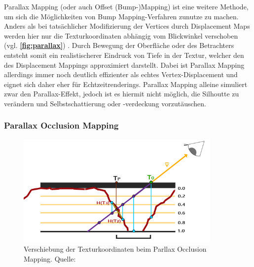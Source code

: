 Parallax Mapping (oder auch Offset (Bump-)Mapping) ist eine weitere Methode, um sich die Möglichkeiten von
Bump Mapping-Verfahren zunutze zu machen. Anders als bei tatsächlicher Modifizierung der Vertices
durch Displacement Maps werden hier nur die Texturkoordinaten abhängig vom Blickwinkel verschoben (vgl. \textbf{\autoref{fig:parallax}}) \parencite{Kaneko2001, Welsh2004}.
Durch Bewegung der Oberfläche oder des Betrachters entsteht somit ein realistischerer Eindruck
von Tiefe in der Textur, welcher den des Displacement Mappings approximiert darstellt.
Dabei ist Parallax Mapping allerdings immer noch deutlich effizienter als echtes Vertex-Displacement
und eignet sich daher eher für Echtzeitrenderings.
Parallax Mapping alleine simuliert zwar den Parallax-Effekt, jedoch ist es hiermit nicht möglich, die Silhoutte zu verändern und
Selbstschattierung oder -verdeckung vorzutäuschen.


\subsubsection{Parallax Occlusion Mapping}
\label{sec:3.3.4}

\begin{figure}
	\centering
	\includegraphics[width=0.89\textwidth]{Grafiken/Basics/Mapping/Infografik_POM.png}
	\begin{footnotesize}
		\caption{Verschiebung der Texturkoordinaten beim Parllax Occlusion Mapping. Quelle: \parencite{LearnOpenGL:POM}}
		\label{fig:pom}
	\end{footnotesize}
\end{figure}


